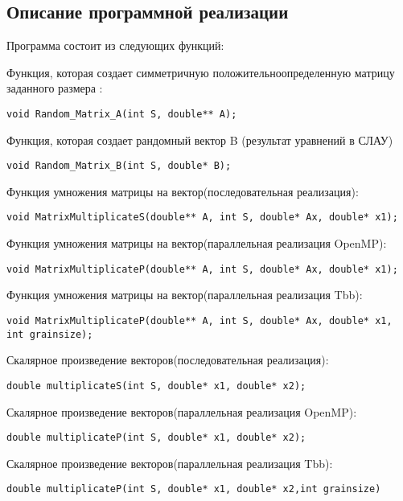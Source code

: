 \documentclass{report}
\begin{document}
\begin{center}
\section*{Описание программной реализации}
\end{center}
\par Программа состоит из следующих функций:
\par Функция, которая создает симметричную положительноопределенную матрицу заданного размера :
\begin{lstlisting}
void Random_Matrix_A(int S, double** A);
\end{lstlisting}
\par Функция, которая создает рандомный вектор B (результат уравнений в СЛАУ)
\begin{lstlisting}
void Random_Matrix_B(int S, double* B);
\end{lstlisting}
\par Функция умножения матрицы на вектор(последовательная реализация):
\begin{lstlisting}
void MatrixMultiplicateS(double** A, int S, double* Ax, double* x1);
\end{lstlisting}
\par Функция умножения матрицы на вектор(параллельная реализация OpenMP):
\begin{lstlisting}
void MatrixMultiplicateP(double** A, int S, double* Ax, double* x1);
\end{lstlisting}
\par Функция умножения матрицы на вектор(параллельная реализация Tbb):
\begin{lstlisting}
void MatrixMultiplicateP(double** A, int S, double* Ax, double* x1, int grainsize);
\end{lstlisting}
\par Скалярное произведение векторов(последовательная реализация):
\begin{lstlisting}
double multiplicateS(int S, double* x1, double* x2);
\end{lstlisting}
\par Скалярное произведение векторов(параллельная реализация OpenMP):
\begin{lstlisting}
double multiplicateP(int S, double* x1, double* x2);
\end{lstlisting}
\par Скалярное произведение векторов(параллельная реализация Tbb):
\begin{lstlisting}
double multiplicateP(int S, double* x1, double* x2,int grainsize)
\end{lstlisting}
\end{document}
